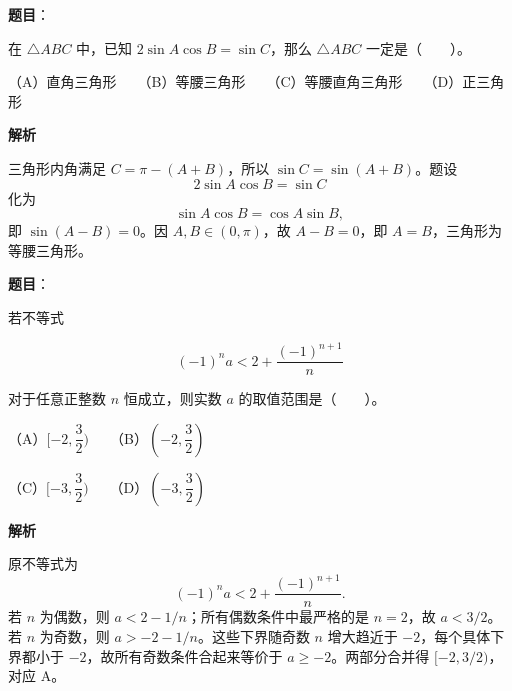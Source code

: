 \begin{answer}

\textbf{题目}：

在 $\triangle ABC$ 中，已知 $2\sin A\cos B=\sin C$，那么 $\triangle ABC$ 一定是\mbox{（　　）}。

（A）直角三角形　　（B）等腰三角形　　（C）等腰直角三角形　　（D）正三角形

\textbf{解析}

三角形内角满足 $C=\pi-(A+B)$，所以 $\sin C=\sin(A+B)$。题设
\nopagebreak[4]
\[
2\sin A\cos B=\sin C
\]
化为
\nopagebreak[4]
\[
\sin A\cos B=\cos A\sin B,
\]
即 $\sin(A-B)=0$。因 $A,B\in(0,\pi)$，故 $A-B=0$，即 $A=B$，三角形为等腰三角形。


\end{answer}
\begin{answer}

\textbf{题目}：

若不等式

\nopagebreak[4]
\[
(-1)^n a<2+\frac{(-1)^{n+1}}{n}
\]

对于任意正整数 $n$ 恒成立，则实数 $a$ 的取值范围是\mbox{（　　）}。

（A）$[-2,\dfrac{3}{2})$　　（B）$(-2,\dfrac{3}{2})$

（C）$[-3,\dfrac{3}{2})$　　（D）$(-3,\dfrac{3}{2})$

\textbf{解析}

原不等式为
\nopagebreak[4]
\[
(-1)^na<2+\frac{(-1)^{n+1}}n.
\]
若 $n$ 为偶数，则 $a<2-1/n$；所有偶数条件中最严格的是 $n=2$，故 $a<3/2$。若 $n$ 为奇数，则 $a>-2-1/n$。这些下界随奇数 $n$ 增大趋近于 $-2$，每个具体下界都小于 $-2$，故所有奇数条件合起来等价于 $a\ge-2$。两部分合并得 $[-2,3/2)$，对应 A。

\gkanswer{答案：A，$[-2,\frac32)$}

\end{answer}

